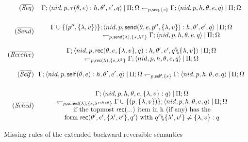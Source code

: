 \documentclass[runningheads]{llncs}
\newcommand{\sslash}{\mathbin{\mkern-4mu \backslash \mkern-6mu \backslash \mkern-4mu}}
\newcommand{\comp}{\:|\:}
\newcommand{\set}[1]{\{#1\}}
\newcommand{\ms}[1]{\mathsf{#1}}
\newcommand{\lh}{\leftharpoondown}
\let\l=\langle
\let\r=\rangle
\begin{document}
\begin{figure}
\small
\hspace{-0.8cm}
  $
  \begin{array}{r@{~~}c}
  	
  (\mathit{\overline{Seq}}) & \displaystyle
  \Gamma; \l nid, p, \tau (\theta,e):h,\theta',e',q \r \comp \Pi; \Omega 
  	\lh_{p,\ms{seq},\{s\}}
  \Gamma; \l nid, p, h,\theta,e,q \r \comp \Pi; \Omega \\[4ex] 
  
  (\mathit{\overline{Send}}) & \displaystyle
  \begin{array}{c}
  	\Gamma \cup \{(p'',\set{\lambda, v})\}; \l nid, p, \ms{send}(\theta,e,p'',\set{\lambda,v}):h,\theta',e',q \r \comp \Pi; \Omega\\ 
  	\hskip 6em 
  	\lh_{p,\ms{send}(\lambda),\{s,\lambda^\Uparrow\}} 
  	\Gamma; \l nid, p, h,\theta,e,q \r \comp \Pi; \Omega 
  \end{array}\\[4ex] 
 
  (\mathit{\overline{Receive}}) & \displaystyle
  \begin{array}{c}
  	\Gamma; \l nid, p, \ms{rec}(\theta,e,\set{\lambda,v},q):h,\theta',e',q \sslash \set{\lambda,v} \r \comp \Pi; \Omega \\
  	\lh_{p,\ms{rec}(\lambda),\{s,\lambda^\Downarrow\}}
  \Gamma; \l nid, p, h,\theta,e,q \r \comp \Pi; \Omega
  \end{array}\\[4ex] 
   
  (\mathit{\overline{Self}}) & \displaystyle
  \Gamma; \l nid, p, \ms{self}(\theta,e):h,\theta',e',q \r \comp \Pi ; \Omega
  	\lh_{p,\ms{self},\{s\}}
  \Gamma; \l nid, p, h,\theta,e,q \r \comp \Pi; \Omega \\[4ex] 
  
  (\mathit{\overline{Sched}}) & \displaystyle
  {\begin{array}{c@{~}c}
   	\Gamma; \l nid, p, h,\theta,e,\set{\lambda,v}:q \r \comp \Pi; \Omega\\ 
  	\lh_{p,\ms{sched}(\lambda),\{s,\lambda^{sched}\}}
  \Gamma\cup \set{(p,\set{\lambda,v})} ; \l nid, p, h,\theta,e,q \r \comp \Pi;\Omega \\
  	  \text{if the topmost } \ms{rec}(...) \text{ item in h (if any) has the}\\
  	  \text{form } \ms{rec}(\theta',e',\{\lambda',v'\},q') \text{ with } q'\sslash \set{\lambda',v'}\not= \set{\lambda,v}:q
  	\end{array}}\\[4ex] 
  \end{array}
  $
\caption{Missing rules of the extended backward reversible semantics}
\label{fig:ex-bwd-semantics2}
\end{figure}
\end{document}
